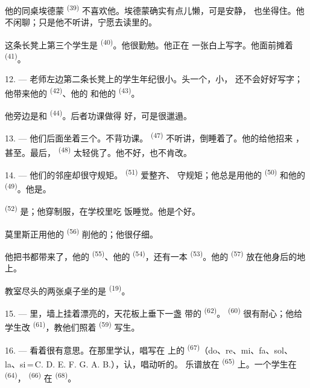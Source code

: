 他的同桌埃德蒙 \textsuperscript{(39)} 不喜欢他。埃德蒙确实有点儿懒，可是安静，
也坐得住。他不闲聊；只是他不听讲，宁愿去读里的。

这条长凳上第三个学生是 \textsuperscript{(40)}。他很勤勉。他正在
一张白上写字。他面前摊着 \textsuperscript{(41)}。

12. --- 老师左边第二条长凳上的学生年纪很小。头一个，小，
还不会好好写字；他带来他的 \textsuperscript{(42)}、他的
和他的 \textsuperscript{(43)}。

他旁边是和 \textsuperscript{(44)}。后者功课做得
好，可是很邋遢。

13. --- 他们后面坐着三个。不背功课。
 \textsuperscript{(47)} 不听讲，倒睡着了。他的给他招来
，甚至。最后，
\textsuperscript{(48)} 太轻佻了。他不好，也不肯改。

14. --- 他们的邻座却很守规矩。 \textsuperscript{(51)} 爱整齐、
守规矩；他总是用他的 \textsuperscript{(50)} 和他的
\textsuperscript{(49)}。他是。

 \textsuperscript{(52)} 是；他穿制服，在学校里吃
饭睡觉。他是个好。

莫里斯正用他的 \textsuperscript{(56)} 削他的；他很仔细。

他把书都带来了，他的 \textsuperscript{(55)}、他的
\textsuperscript{(54)}，还有一本 \textsuperscript{(53)}。他的
\textsuperscript{(57)} 放在他身后的地上。

教室尽头的两张桌子坐的是 \textsuperscript{(19)}。

\VUsaut{4.6mm}
\VUsaut{3.4mm}

15. --- 里，墙上挂着漂亮的，天花板上垂下一盏
带的 \textsuperscript{(62)}。 \textsuperscript{(60)}
很有耐心；他给学生改 \textsuperscript{(61)}，教他们照着
\textsuperscript{(59)} 写生。

16. --- 看着很有意思。在那里学认，唱写在
上的 \textsuperscript{(67)}（do、re、mi、fa、sol、
la、si\,=\,C. D. E. F. G. A. B.），认，唱动听的。
乐谱放在 \textsuperscript{(65)} 上。一个学生在
\textsuperscript{(64)}， \textsuperscript{(66)} 在
\textsuperscript{(68)}。

